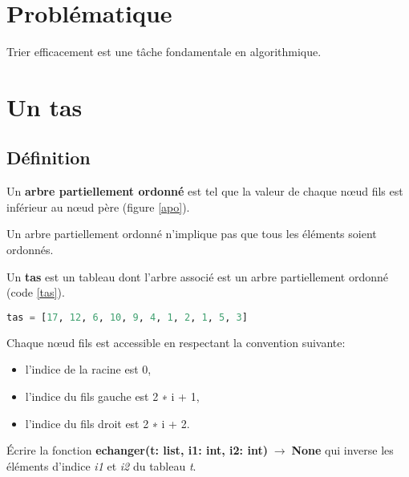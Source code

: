 \documentclass[a4paper,11pt]{article}
\begin{document}
\begin{Form}
\section{Problématique}
Trier efficacement est une tâche fondamentale en algorithmique.
\begin{center}
\end{center}
\section{Un tas}
\subsection{Définition}
Un \textbf{arbre partiellement ordonné} est tel que la valeur de chaque nœud fils est inférieur au nœud père (figure \ref{apo}).
\begin{center}
\label{apo}
\end{center}
\begin{commentprof}
Un arbre partiellement ordonné n'implique pas que tous les éléments soient ordonnés.
\end{commentprof}
Un \textbf{tas} est un tableau dont l'arbre associé est un arbre partiellement ordonné (code \ref{tas}).
\begin{center}
\begin{lstlisting}[language=Python]
tas = [17, 12, 6, 10, 9, 4, 1, 2, 1, 5, 3]
\end{lstlisting}
\label{tas}
\end{center}
Chaque nœud fils est accessible en respectant la convention suivante:
\begin{itemize}
\item l'indice de la racine est 0,
\item l’indice du fils gauche est 2 ∗ i + 1,
\item l’indice du fils droit est 2 ∗ i + 2.
\end{itemize}
\begin{activite}
Écrire la fonction \textbf{echanger(t: list, i1: int, i2: int)$\;\rightarrow\;$None} qui inverse les éléments d'indice \emph{i1} et \emph{i2} du tableau \emph{t}.
\end{activite}

\end{Form}
\end{document}
